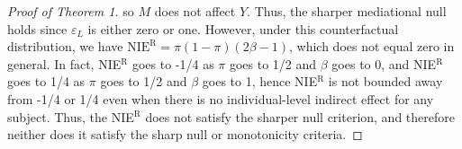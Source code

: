 \documentclass[12pt]{article}
\begin{document}
\begin{proof}[Proof of Theorem 1]
\begin{comment}
    &=f_Y(a,a,1-\varepsilon_M)=f_Y[a,L(a),M\{a^*,L(a^*)\}]=Y\{a,M(a^*)\},
\end{align*}
and
\begin{align*}
    Y\{a^*,M(a)\}&=f_Y[a^*,L(a^*),M\{a,L(a)\}]=f_Y(a^*,a^*,\varepsilon_M)=0\\
    &=f_Y(a^*,a^*,1-\varepsilon_M)=f_Y[a^*,L(a^*),M\{a^*,L(a^*)\}]=Y\{a^*,M(a^*)\},
\end{align*}
\end{comment}
so $M$ does not affect $Y$. Thus, the sharper mediational null holds %
since $\varepsilon_L$ is either zero or one. However, under this counterfactual distribution, we have $\mathrm{NIE}^{\mathrm{R}}=\pi(1-\pi)(2\beta-1)$, 
which does not equal zero in general. In fact, NIE$^{\mathrm{R}}$ goes to -1/4 as $\pi$ goes to 1/2 and $\beta$ goes to 0, and NIE$^{\mathrm{R}}$ goes to 1/4 as $\pi$ goes to 1/2 and $\beta$ goes to 1, hence NIE$^{\mathrm{R}}$ is not bounded away from -1/4 or 1/4 even when there is no individual-level indirect effect for any subject. Thus, the NIE$^{\mathrm{R}}$ does not satisfy the sharper null criterion, and therefore neither does it satisfy the sharp null or monotonicity criteria.
\end{proof}
\end{document}
